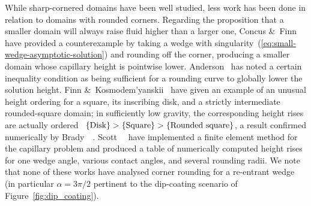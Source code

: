 \begin{figure}
\end{figure}

While sharp-cornered domains have been well studied,
less work has been done in relation to domains with rounded corners.
Regarding the proposition that
a smaller domain will always raise fluid higher than a larger one,
Concus \&~Finn~\cite{concus-1976-height-capillary-surface}
have provided a counterexample
by taking a wedge with singularity~(\ref{eq:small-wedge-asymptotic-solution})
and rounding off the corner,
producing a smaller domain whose capillary height is pointwise lower.
Anderson~\cite[Section~7.3.2]{anderson-2002-thesis-boundary-tracing-pdes}
has noted a certain inequality condition as being sufficient
for a rounding curve to globally lower the solution height.
Finn \&~Kosmodem'yanskii~%
  \cite{finn-2002-unusual-comparison-properties-capillary}
have given an example of an unusual height ordering
for a square, its inscribing disk,
and a strictly intermediate rounded-square domain;
in sufficiently low gravity,
the corresponding height rises are actually ordered~%
$\{\textnormal{Disk}\}
  > \{\textnormal{Square}\}
  > \{\textnormal{Rounded square}\}$,
a result confirmed numerically
by Brady~\etal~\cite{brady-2003-capillary-rise-nesting-cylinders}.
Scott~\etal~\cite{scott-2005-computation-capillary-laplace-young}
have implemented a finite element method for the capillary problem
and produced a table of numerically computed height rises
for one wedge angle, various contact angles, and several rounding radii.
We note that none of these works
have analysed corner rounding for a re-entrant wedge
(in particular $\alpha = 3\pi/2$ pertinent to the dip-coating scenario
of Figure~\ref{fig:dip_coating}).

\begin{figure}
\end{figure}

